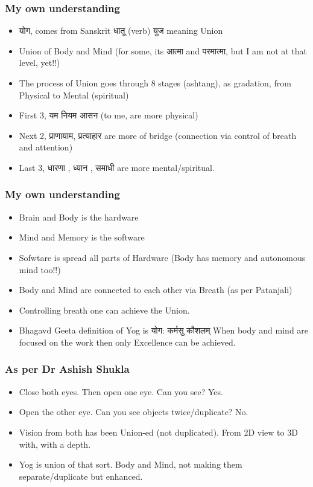 \begin{frame}[fragile]\frametitle{My own understanding}

	\begin{itemize}
	\item योग, comes from Sanskrit धातू  (verb) युज meaning Union
	\item Union of Body and Mind (for some, its आत्मा  and परमात्मा, but I am not at that level, yet!!)
	\item The process of Union goes through 8 stages (ashtang), as gradation, from Physical to Mental (spiritual)
	\item First 3, यम  नियम  आसन  (to me, are more physical)
	\item Next 2, प्राणायाम, प्रत्याहार  are more of bridge (connection via control of breath and attention)
	\item Last 3, धारणा , ध्यान , समाधी  are more mental/spiritual.
	\end{itemize}

\end{frame}


\begin{frame}[fragile]\frametitle{My own understanding}

	\begin{itemize}
	\item Brain and Body is the hardware
	\item Mind and Memory is the software
	\item Sofwtare is spread all parts of Hardware (Body has memory and autonomous mind too!!)
	\item Body and Mind are connected to each other via Breath (as per Patanjali)
	\item Controlling breath one can achieve the Union.
	\item Bhagavd Geeta definition of Yog is योग: कर्मसु कौशलम् When body and mind are focused on the work then only Excellence can be achieved.
	\end{itemize}

\end{frame}

\begin{frame}[fragile]\frametitle{As per Dr Ashish Shukla}

	\begin{itemize}
	\item Close both eyes. Then open one eye. Can you see? Yes.
	\item Open the other eye. Can you see objects twice/duplicate? No.
	\item Vision from both has been Union-ed (not duplicated). From 2D view to 3D with, with a depth.
	\item Yog is union of that sort. Body and Mind, not making them separate/duplicate but enhanced.
	\end{itemize}

\end{frame}

